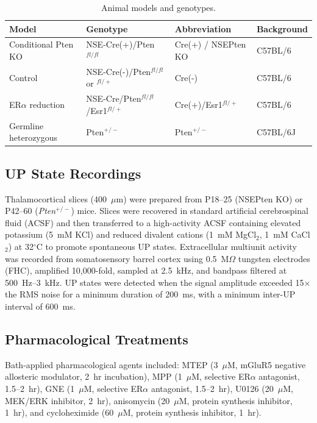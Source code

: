 \documentclass[11pt]{article}
\begin{document}
\begin{table}[htbp]
\centering
\caption{Animal models and genotypes.}
\label{tab:models}
\begin{tabular}{llll}
\toprule
Model & Genotype & Abbreviation & Background \\
\midrule
Conditional Pten KO & NSE-Cre(+)/Pten$^{fl/fl}$ & Cre(+) / NSEPten KO & C57BL/6 \\
Control & NSE-Cre(-)/Pten$^{fl/fl}$ or $^{fl/+}$ & Cre(-) & C57BL/6 \\
ER$\alpha$ reduction & NSE-Cre/Pten$^{fl/fl}$/Esr1$^{fl/+}$ & Cre(+)/Esr1$^{fl/+}$ & C57BL/6 \\
Germline heterozygous & Pten$^{+/-}$ & Pten$^{+/-}$ & C57BL/6J \\
\bottomrule
\end{tabular}
\end{table}

\subsection{UP State Recordings}

Thalamocortical slices (400~$\mu$m) were prepared from P18--25 (NSEPten KO) or P42--60 (\textit{Pten}$^{+/-}$) mice. Slices were recovered in standard artificial cerebrospinal fluid (ACSF) and then transferred to a high-activity ACSF containing elevated potassium (5~mM KCl) and reduced divalent cations (1~mM MgCl$_2$, 1~mM CaCl$_2$) at 32$^{\circ}$C to promote spontaneous UP states. Extracellular multiunit activity was recorded from somatosensory barrel cortex using 0.5~M$\Omega$ tungsten electrodes (FHC), amplified 10,000-fold, sampled at 2.5~kHz, and bandpass filtered at 500~Hz--3~kHz. UP states were detected when the signal amplitude exceeded 15$\times$ the RMS noise for a minimum duration of 200~ms, with a minimum inter-UP interval of 600~ms.

\subsection{Pharmacological Treatments}

Bath-applied pharmacological agents included: MTEP (3~$\mu$M, mGluR5 negative allosteric modulator, 2~hr incubation), MPP (1~$\mu$M, selective ER$\alpha$ antagonist, 1.5--2~hr), GNE (1~$\mu$M, selective ER$\alpha$ antagonist, 1.5--2~hr), U0126 (20~$\mu$M, MEK/ERK inhibitor, 2~hr), anisomycin (20~$\mu$M, protein synthesis inhibitor, 1~hr), and cycloheximide (60~$\mu$M, protein synthesis inhibitor, 1~hr).
\end{document}

